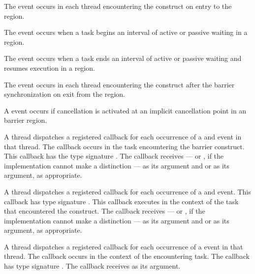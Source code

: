 \events
The  event occurs in each thread encountering the
 construct on entry to the  region.

The  event occurs when a task begins an interval of active or passive waiting
in a  region.

The  event occurs when a task ends an interval of active or passive waiting
and resumes execution in a  region.

The  event occurs in each thread encountering the
 construct after the barrier synchronization on exit from the
 region.

A  event occurs if cancellation is activated at an implicit cancellation point in an barrier region.

\tools

A thread dispatches a registered 
callback for each occurrence of a  and  event
in that thread.  The callback occurs in the task encountering
the barrier construct.  This callback has the type signature
.
The callback receives
 --- or
, if the implementation cannot make a
distinction --- as its  argument and
 or 
as its  argument, as appropriate.

A thread dispatches a registered
 callback
for each occurrence of a  and  event.
This callback has type signature .
This callback executes in the context of the task that encountered the
 construct. The callback receives
 --- or
, if the implementation cannot make a
distinction --- as its  argument and
 or 
as its  argument, as appropriate.

A thread dispatches a registered 
callback for each occurrence of a  event in that thread.
The callback occurs in the context of the encountering task.  The callback has type signature
.
The callback receives  as its  argument.

